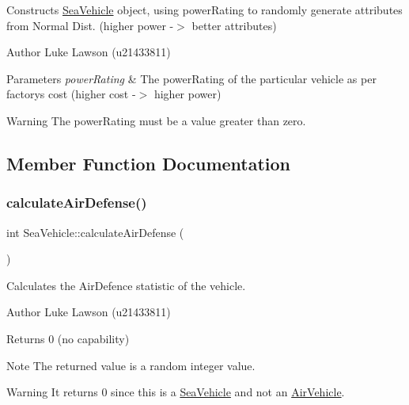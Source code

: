 Constructs \mbox{\hyperlink{class_sea_vehicle}{Sea\+Vehicle}} object, using power\+Rating to randomly generate attributes from Normal Dist. (higher power -\/$>$ better attributes) 

\begin{DoxyAuthor}{Author}
Luke Lawson (u21433811) 
\end{DoxyAuthor}

\begin{DoxyParams}{Parameters}
{\em power\+Rating} & The power\+Rating of the particular vehicle as per factory\textquotesingle{}s cost (higher cost -\/$>$ higher power) \\
\hline
\end{DoxyParams}
\begin{DoxyWarning}{Warning}
The power\+Rating must be a value greater than zero. 
\end{DoxyWarning}


\subsection{Member Function Documentation}
\mbox{\label{class_sea_vehicle_a694afec180b77cee3adf29674e0c3160}} 
\subsubsection{\texorpdfstring{calculateAirDefense()}{calculateAirDefense()}}
{\footnotesize\ttfamily int Sea\+Vehicle\+::calculate\+Air\+Defense (\begin{DoxyParamCaption}{ }\end{DoxyParamCaption})\hspace{0.3cm}{\ttfamily [virtual]}}



Calculates the Air\+Defence statistic of the vehicle. 

\begin{DoxyAuthor}{Author}
Luke Lawson (u21433811) 
\end{DoxyAuthor}
\begin{DoxyReturn}{Returns}
0 (no capability) 
\end{DoxyReturn}
\begin{DoxyNote}{Note}
The returned value is a random integer value. 
\end{DoxyNote}
\begin{DoxyWarning}{Warning}
It returns 0 since this is a \mbox{\hyperlink{class_sea_vehicle}{Sea\+Vehicle}} and not an \mbox{\hyperlink{class_air_vehicle}{Air\+Vehicle}}. 
\end{DoxyWarning}


